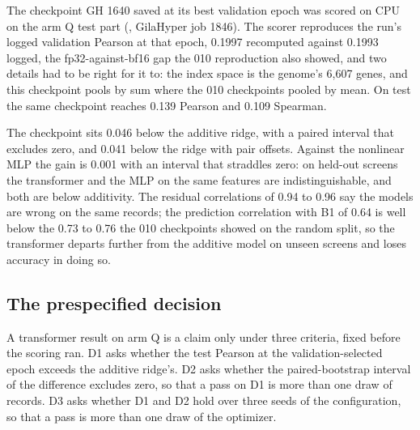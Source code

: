 The checkpoint GH 1640 saved at its best validation epoch was scored on CPU on the
arm Q test part (,
GilaHyper job 1846). The scorer reproduces the run's logged validation Pearson at
that epoch, 0.1997 recomputed against 0.1993 logged, the fp32-against-bf16 gap the
010 reproduction also showed, and two details had to be right for it to: the index
space is the genome's 6{,}607 genes, and this checkpoint pools by sum where the 010
checkpoints pooled by mean. On test the same checkpoint reaches 0.139 Pearson and
0.109 Spearman.

\begin{table}[htbp]
\centering
\footnotesize
\caption{GH 1640's epoch 7 checkpoint against three nulls on the arm Q test part,
37{,}791 records. Gain is the transformer's Pearson minus the baseline's; the
interval is a paired bootstrap over records, 2{,}000 resamples, percentile method.
Residual correlation is between $y - \hat{y}$ of the two models; prediction
correlation is between the two prediction vectors.}
\label{tab:armqpaired}

\end{table}

The checkpoint sits 0.046 below the additive ridge, with a paired interval that
excludes zero, and 0.041 below the ridge with pair offsets. Against the nonlinear
MLP the gain is 0.001 with an interval that straddles zero: on held-out screens
the transformer and the MLP on the same features are indistinguishable, and both
are below additivity. The residual correlations of 0.94 to 0.96 say the models are
wrong on the same records; the prediction correlation with B1 of 0.64 is well below
the 0.73 to 0.76 the 010 checkpoints showed on the random split, so the
transformer departs further from the additive model on unseen screens and loses
accuracy in doing so.

\subsection{The prespecified decision}
\label{sec:decision}

A transformer result on arm Q is a claim only under three criteria, fixed before
the scoring ran. D1 asks whether the test Pearson at the validation-selected epoch
exceeds the additive ridge's. D2 asks whether the paired-bootstrap interval of the
difference excludes zero, so that a pass on D1 is more than one draw of records.
D3 asks whether D1 and D2 hold over three seeds of the configuration, so that a
pass is more than one draw of the optimizer.

